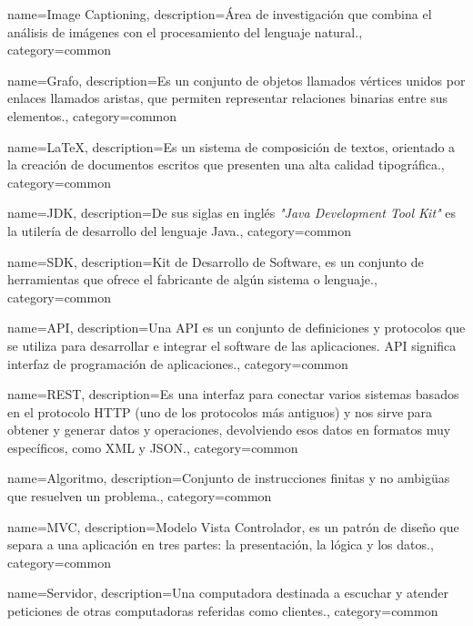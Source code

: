 {
    name=Image Captioning,
    description={Área de investigación que combina el análisis de imágenes con el procesamiento del lenguaje natural.},
    category={common}
}

{
    name=Grafo,
    description={Es un conjunto de objetos llamados vértices unidos por enlaces llamados aristas, que permiten representar relaciones binarias entre sus elementos.},
    category={common}
}

{
    name=LaTeX,
    description={Es un sistema de composición de textos, orientado a la creación de documentos escritos que presenten una alta calidad tipográfica.},
    category={common}
}

{
    name=JDK,
    description={De sus siglas en inglés \textit{"Java Development Tool Kit"} es la utilería de desarrollo del lenguaje Java.},
    category={common}
}

{
    name=SDK,
    description={Kit de Desarrollo de Software, es un conjunto de herramientas que ofrece el fabricante de algún sistema o lenguaje.},
    category={common}
}

{
    name=API,
    description={Una API es un conjunto de definiciones y protocolos que se utiliza para desarrollar e integrar el software de las aplicaciones. API significa interfaz de programación de aplicaciones.},
    category={common}
}

{
    name=REST,
    description={Es una interfaz para conectar varios sistemas basados en el protocolo HTTP (uno de los protocolos más antiguos) y nos sirve para obtener y generar datos y operaciones, devolviendo esos datos en formatos muy específicos, como XML y JSON.},
    category={common}
}

{
    name=Algoritmo,
    description={Conjunto de instrucciones finitas y no ambigüas que resuelven un problema.},
    category={common}
}

{
    name=MVC,
    description={Modelo Vista Controlador, es un patrón de diseño que separa a una aplicación en tres partes: la presentación, la lógica y los datos.},
    category={common}
}

{
    name=Servidor,
    description={Una computadora destinada a escuchar y atender peticiones de otras computadoras referidas como clientes.},
    category={common}
}

